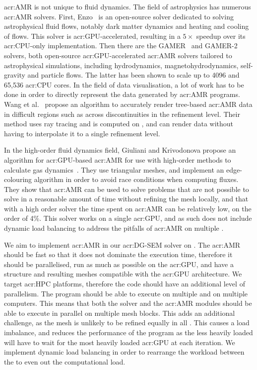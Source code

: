 \Acrlong{acr:AMR} is not unique to fluid dynamics. The field of astrophysics has numerous
\acrshort{acr:AMR} solvers. First, Enzo~\cite{Bryan2014} is an open-source solver dedicated to
solving astrophysical fluid flows, notably dark matter dynamics and heating and cooling of flows.
This solver is \acrshort{acr:GPU}-accelerated, resulting in a \(5 \times \) speedup over its
\acrshort{acr:CPU}-only implementation. Then there are the GAMER~\cite{Schive2010} and
GAMER-2~\cite{Schive2018} solvers, both open-source \acrshort{acr:GPU}-accelerated
\acrshort{acr:AMR} solvers tailored to astrophysical simulations, including hydrodynamics,
magnetohydrodynamics, self-gravity and particle flows. The latter has been shown to scale up to 4096
 and 65,536 \acrshort{acr:CPU} cores. In the field of data visualisation, a lot
of work has to be done in order to directly represent the data generated by \acrshort{acr:AMR}
programs. Wang et al.~\cite{Wang2020} propose an algorithm to accurately render tree-based
\acrshort{acr:AMR} data in difficult regions such as across discontinuities in the refinement level.
Their method uses ray tracing and is computed on , and can render data without
having to interpolate it to a single refinement level.

In the high-order fluid dynamics field, Giuliani and Krivodonova propose an algorithm for
\acrshort{acr:GPU}-based \acrlong{acr:AMR} for use with high-order methods to calculate gas
dynamics~\cite{Giuliani2019}. They use triangular meshes, and implement an edge-colouring algorithm
in order to avoid race conditions when computing fluxes. They show that \acrshort{acr:AMR} can be
used to solve problems that are not possible to solve in a reasonable amount of time without
refining the mesh locally, and that with a high order solver the time spent on \acrshort{acr:AMR}
can be relatively low, on the order of 4\%. This solver works on a single \acrshort{acr:GPU}, and as
such does not include dynamic load balancing to address the pitfalls of \acrshort{acr:AMR} on
multiple .

We aim to implement \acrshort{acr:AMR} in our \acrshort{acr:DG-SEM} solver on .
The \acrshort{acr:AMR} should be fast so that it does not dominate the execution time, therefore it
should be parallelised, run as much as possible on the \acrshort{acr:GPU}, and have a structure and
resulting meshes compatible with the \acrshort{acr:GPU} architecture. We target \acrshort{acr:HPC}
platforms, therefore the code should have an additional level of parallelism. The program should be
able to execute on multiple  and on multiple computers. This means that both the
solver and the \acrshort{acr:AMR} modules should be able to execute in parallel on multiple mesh
blocks. This adds an additional challenge, as the mesh is unlikely to be refined equally in all
. This causes a load imbalance, and reduces the performance of the program as
the less heavily loaded  will have to wait for the most heavily loaded
\acrshort{acr:GPU} at each iteration. We implement dynamic load balancing in order to rearrange the
workload between the  to even out the computational load.

